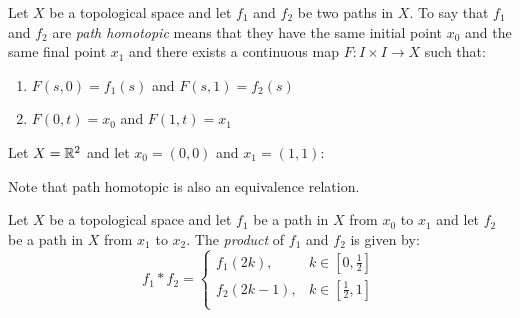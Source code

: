 \documentclass[letterpaper,12pt,fleqn]{article}
\begin{document}
\begin{definition}
  Let \(X\) be a topological space and let \(f_1\) and \(f_2\) be two paths in \(X\).  To say that \(f_1\) and
  \(f_2\) are \emph{path homotopic} means that they have the same initial point \(x_0\) and the same final point
  \(x_1\) and there exists a continuous map \(F:I\times I\to X\) such that:
  \begin{enumerate}
  \item \(F(s,0)=f_1(s)\) and \(F(s,1)=f_2(s)\)
  \item \(F(0,t)=x_0\) and \(F(1,t)=x_1\)
  \end{enumerate}
\end{definition}

\begin{example}
  Let \(X=\mathbb{R}^2\) and let \(x_0=(0,0)\) and \(x_1=(1,1)\):

\end{example}

Note that path homotopic is also an equivalence relation.

\begin{definition}
  Let \(X\) be a topological space and let \(f_1\) be a path in \(X\) from \(x_0\) to \(x_1\) and let \(f_2\) be a
  path in \(X\) from \(x_1\) to \(x_2\).  The \emph{product} of \(f_1\) and \(f_2\) is given by:
  \[f_1*f_2=\begin{cases}
  f_1(2k), & k\in\left[0,\frac{1}{2}\right] \\
  f_2(2k-1), & k\in\left[\frac{1}{2},1\right] \\
  \end{cases}\]
\end{definition}
\end{document}
